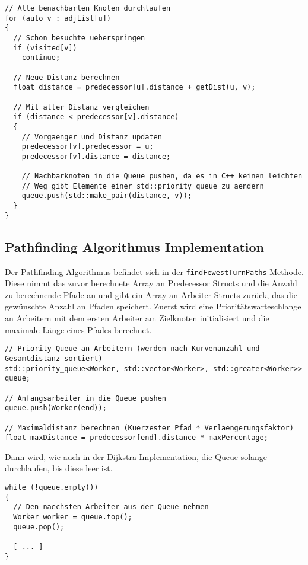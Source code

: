 \documentclass[a4paper,10pt,ngerman]{scrartcl}
\begin{document}
\begin{lstlisting}[frame=single]
// Alle benachbarten Knoten durchlaufen
for (auto v : adjList[u])
{
  // Schon besuchte ueberspringen
  if (visited[v])
    continue;

  // Neue Distanz berechnen
  float distance = predecessor[u].distance + getDist(u, v);

  // Mit alter Distanz vergleichen
  if (distance < predecessor[v].distance)
  {
    // Vorgaenger und Distanz updaten
    predecessor[v].predecessor = u;
    predecessor[v].distance = distance;

    // Nachbarknoten in die Queue pushen, da es in C++ keinen leichten
    // Weg gibt Elemente einer std::priority_queue zu aendern
    queue.push(std::make_pair(distance, v));
  }
}
\end{lstlisting}

\subsection{Pathfinding Algorithmus Implementation}
Der Pathfinding Algorithmus befindet sich in der \texttt{findFewestTurnPaths} Methode. Diese nimmt das zuvor berechnete Array an Predecessor Structs und die Anzahl
zu berechnende Pfade an und gibt ein Array an Arbeiter Structs zurück, das die gewünschte Anzahl an Pfaden speichert.
Zuerst wird eine Prioritätswarteschlange an Arbeitern mit dem ersten Arbeiter am Zielknoten initialisiert und die maximale Länge eines Pfades berechnet.

\begin{lstlisting}[frame=single]
// Priority Queue an Arbeitern (werden nach Kurvenanzahl und Gesamtdistanz sortiert)
std::priority_queue<Worker, std::vector<Worker>, std::greater<Worker>> queue;

// Anfangsarbeiter in die Queue pushen
queue.push(Worker(end));

// Maximaldistanz berechnen (Kuerzester Pfad * Verlaengerungsfaktor)
float maxDistance = predecessor[end].distance * maxPercentage;
\end{lstlisting}

Dann wird, wie auch in der Dijkstra Implementation, die Queue solange durchlaufen, bis diese leer ist.

\begin{lstlisting}[frame=single]
while (!queue.empty())
{
  // Den naechsten Arbeiter aus der Queue nehmen
  Worker worker = queue.top();
  queue.pop();
  
  [ ... ]
}
\end{lstlisting}
\end{document}
